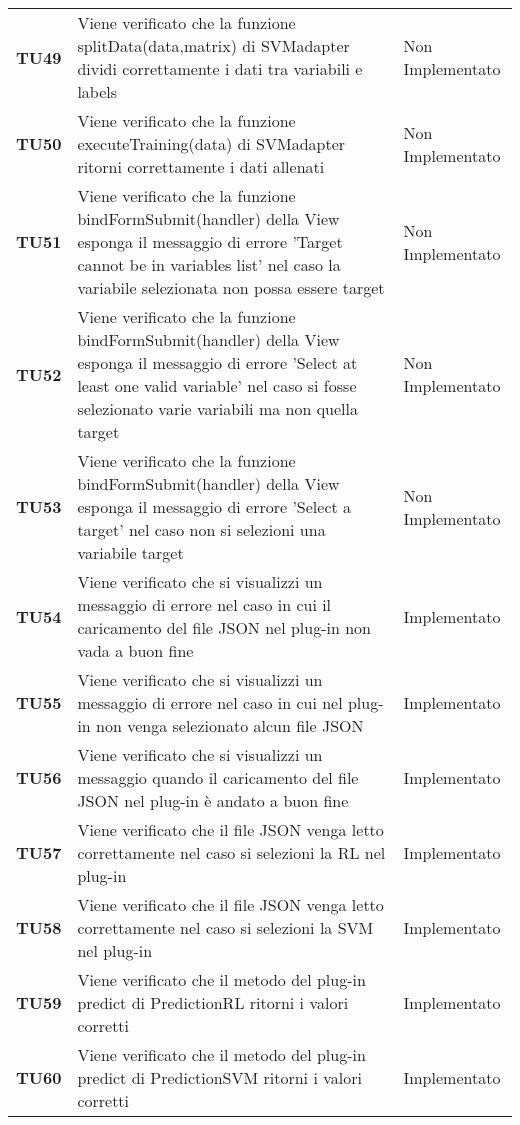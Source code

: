 \documentclass[../piano-di-qualifica.tex]{subfiles}
\begin{document}
\begin{longtable}[H]{>{\centering\bfseries}m{2.5cm} >{\centering}m{7.5cm} >{\centering\arraybackslash}m{3.5cm}}
  \textbf{TU49} & Viene verificato che la funzione splitData(data,matrix) di SVMadapter dividi correttamente i dati tra variabili e labels & Non Implementato \\
  \textbf{TU50} & Viene verificato che la funzione executeTraining(data) di SVMadapter ritorni correttamente i dati allenati & Non Implementato \\
  \textbf{TU51} & Viene verificato che la funzione bindFormSubmit(handler) della View esponga il messaggio di errore 'Target cannot be in variables list' nel caso la variabile selezionata non possa essere target  & Non Implementato \\
  \textbf{TU52} & Viene verificato che la funzione bindFormSubmit(handler) della View esponga il messaggio di errore 'Select at least one valid variable' nel caso si fosse selezionato varie variabili ma non quella target  & Non Implementato \\
  \textbf{TU53} & Viene verificato che la funzione bindFormSubmit(handler) della View esponga il messaggio di errore 'Select a target' nel caso non si selezioni una variabile target  & Non Implementato \\
  \textbf{TU54} & Viene verificato che si visualizzi un messaggio di errore nel caso in cui il caricamento del file JSON nel plug-in non vada a buon fine & Implementato \\
  \textbf{TU55} & Viene verificato che si visualizzi un messaggio di errore nel caso in cui nel plug-in non venga selezionato alcun file JSON & Implementato \\
  \textbf{TU56} & Viene verificato che si visualizzi un messaggio quando il caricamento del file JSON nel plug-in è andato a buon fine & Implementato \\
  \textbf{TU57} & Viene verificato che il file JSON venga letto correttamente nel caso si selezioni la RL nel plug-in & Implementato \\
  \textbf{TU58} & Viene verificato che il file JSON venga letto correttamente nel caso si selezioni la SVM nel plug-in & Implementato \\
  \textbf{TU59} & Viene verificato che il metodo del plug-in predict di PredictionRL ritorni i valori corretti & Implementato \\
  \textbf{TU60} & Viene verificato che il metodo del plug-in predict di PredictionSVM ritorni i valori corretti & Implementato \\
\end{longtable}
\end{document}

